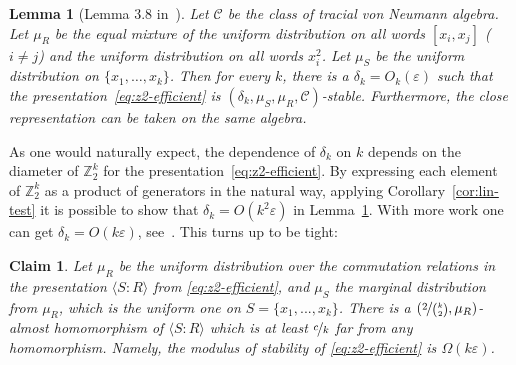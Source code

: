 \documentclass[11pt]{article}
\newtheorem{lemma}[theorem]{Lemma}
\newtheorem{claim}[theorem]{Claim}
\theoremstyle{definition}
\newcommand{\Z}{\ensuremath{\mathbb{Z}}}
\newcommand{\mC}{\ensuremath{\mathcal{C}}}
\newcommand{\eps}{\varepsilon}
\begin{document}
\begin{lemma}[Lemma 3.8 in~\cite{slofstra2019set}]\label{lem:eff-z2}
Let $\mC$ be the class of tracial von Neumann algebra. Let $\mu_R$ be the equal mixture of the uniform distribution on all words $[x_i,x_j]$ ($i\neq j$) and the uniform distribution on all words $x_i^2$. Let $\mu_S$ be the uniform distribution on $\{x_1,\ldots,x_k\}$. Then 
  for every $k$, there is a $\delta_k = O_k(\eps)$ such that the presentation~\eqref{eq:z2-efficient} is $(\delta_k,\mu_S,\mu_R,\mC)$-stable. Furthermore, the close representation can be taken on the same algebra.%
\end{lemma}

As one would naturally expect, the dependence of $\delta_k$ on $k$ depends on the diameter of $\Z_2^k$ for the presentation~\eqref{eq:z2-efficient}. By expressing each element of $\Z_2^k$ as a product of generators in the natural way, applying Corollary~\ref{cor:lin-test} it is possible to show that $\delta_k=O(k^2\eps)$ in Lemma~\ref{lem:eff-z2}. With more work one can get $\delta_k=O(k\eps)$, see~\cite[Theorem 3.2]{chao2017overlapping}. This turns up to be  tight:
\begin{claim}
    Let $\mu_R$ be the uniform distribution over the commutation relations in the presentation $\langle S\colon R\rangle$ from \eqref{eq:z2-efficient}, and $\mu_S$ the marginal distribution from $\mu_R$, which is the uniform one on $S=\{x_1,...,x_k\}$. There is a $(\nicefrac{2}{\binom{k}{2}},\mu_R)$-almost homomorphism of $\langle S\colon R\rangle$ which is at least $\nicefrac{c}{k}$ far from any homomorphism. Namely, the modulus of stability of \eqref{eq:z2-efficient} is $\Omega(k\eps)$.
\end{claim}
\end{document}
